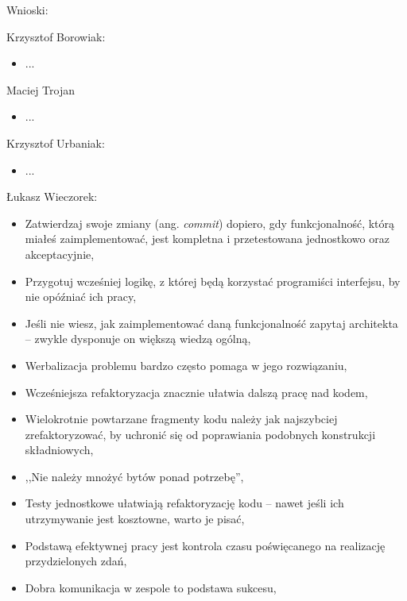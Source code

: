 Wnioski:
\begin{description}
\item Krzysztof Borowiak:
\begin{itemize}
\item ...
\end{itemize}
\item Maciej Trojan
\begin{itemize}
\item ...
\end{itemize}
\item Krzysztof Urbaniak:
\begin{itemize}
\item ...
\end{itemize}
\item Łukasz Wieczorek:
\begin{itemize}
\item Zatwierdzaj swoje zmiany (ang. \emph{commit}) dopiero, gdy funkcjonalność, którą miałeś zaimplementować, jest kompletna i przetestowana jednostkowo oraz akceptacyjnie,
\item Przygotuj wcześniej logikę, z której będą korzystać programiści interfejsu, by nie opóźniać ich pracy,
\item Jeśli nie wiesz, jak zaimplementować daną funkcjonalność zapytaj architekta -- zwykle dysponuje on większą wiedzą ogólną,
\item Werbalizacja problemu bardzo często pomaga w jego rozwiązaniu,
\item Wcześniejsza refaktoryzacja znacznie ułatwia dalszą pracę nad kodem,
\item Wielokrotnie powtarzane fragmenty kodu należy jak najszybciej zrefaktoryzować, by uchronić się od poprawiania podobnych konstrukcji składniowych,
\item ,,Nie należy mnożyć bytów ponad potrzebę'',
\item Testy jednostkowe ułatwiają refaktoryzację kodu -- nawet jeśli ich utrzymywanie jest kosztowne, warto je pisać,
\item Podstawą efektywnej pracy jest kontrola czasu poświęcanego na realizację przydzielonych zdań,
\item Dobra komunikacja w zespole to podstawa sukcesu,
\end{itemize}
\end{description}
